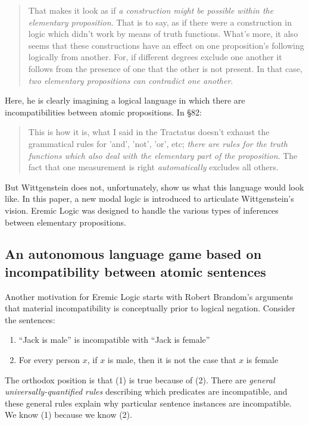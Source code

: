 \begin{quote}
  That makes it look as if \emph{a construction might be possible
    within the elementary proposition}. That is to say, as if there
  were a construction in logic which didn't work by means of truth
  functions.  What's more, it also seems that these constructions have
  an effect on one proposition's following logically from another.
  For, if different degrees exclude one another it follows from the
  presence of one that the other is not present.  In that case,
  \emph{two elementary propositions can contradict one another}.
\end{quote}

\NI Here, he is clearly imagining a logical language in which there
are incompatibilities between atomic propositions. In \S 82:

\begin{quote}
  This is how it is, what I said in the Tractatus doesn't exhaust the
  grammatical rules for 'and', 'not', 'or', etc; \emph{there are rules
    for the truth functions which also deal with the elementary part
    of the proposition}.  The fact that one measurement is right
  \emph{automatically} excludes all others.
\end{quote}

\NI But Wittgenstein does not, unfortunately, show us what this
language would look like.  In this paper, a new modal logic is
introduced to articulate Wittgenstein's vision.  Eremic Logic was
designed to handle the various types of inferences between elementary
propositions.

\subsection{An autonomous language game based on incompatibility between atomic sentences}

\NI Another motivation for Eremic Logic starts with Robert Brandom's
arguments that material incompatibility is conceptually prior to
logical negation.  Consider the sentences:
\begin{enumerate}

\item ``Jack is male'' is incompatible with ``Jack is female''
\item For every person $x$, if $x$ is male, then it is not the case that $x$ is female

\end{enumerate}

\NI The orthodox position is that (1) is true because of (2).  There
are \emph{general universally-quantified rules} describing which
predicates are incompatible, and these general rules explain why
particular sentence instances are incompatible.  We know (1) because
we know (2).

